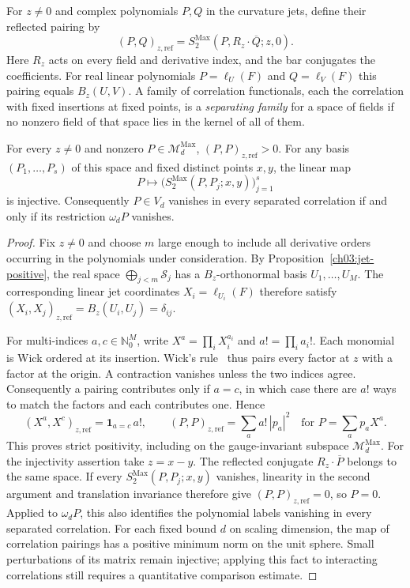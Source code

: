 For $z\ne0$ and complex polynomials $P,Q$ in the curvature jets, define
their reflected pairing by
\[
 (P,Q)_{z,\mathrm{ref}}
   =S_2^{\mathrm{Max}}(P,R_z\cdot\overline Q;z,0).
\]
Here $R_z$ acts on every field and derivative index, and the bar
conjugates the coefficients. For real linear polynomials
$P=\ell_U(F)$ and $Q=\ell_V(F)$ this pairing equals $B_z(U,V)$. A family of correlation functionals, each the correlation with fixed insertions at fixed points, is a \emph{separating family} for a space of fields if no nonzero field of that space lies in the kernel of all of them.

\begin{corollary}
\label{ch03:detectors}
For every $z\ne0$ and nonzero $P\in\mathcal M_d^{\mathrm{Max}}$,
$(P,P)_{z,\mathrm{ref}}>0$.
For any basis $(P_1,\ldots,P_s)$ of this space and fixed distinct points
$x,y$, the linear map
\[
 P\longmapsto
 \big(S_2^{\mathrm{Max}}(P,P_j;x,y)\big)_{j=1}^s
\]
is injective. Consequently $P\in V_d$ vanishes in every separated correlation if
and only if its restriction $\omega_dP$ vanishes.
\end{corollary}

\begin{proof}
Fix $z\ne0$ and choose $m$ large enough to include all derivative orders
occurring in the polynomials under consideration. By
Proposition~\ref{ch03:jet-positive}, the real space
$\bigoplus_{j<m}\mathcal S_j$ has a $B_z$-orthonormal basis
$U_1,\ldots,U_M$. The corresponding linear jet coordinates
$X_i=\ell_{U_i}(F)$ therefore satisfy
$(X_i,X_j)_{z,\mathrm{ref}}=B_z(U_i,U_j)=\delta_{ij}$.

For multi-indices $a,c\in\mathbb N_0^M$, write $X^a=\prod_i X_i^{a_i}$
and $a!=\prod_i a_i!$. Each monomial is Wick ordered at its insertion.
Wick's rule~\cite{Wick1950} thus pairs every factor at $z$ with a factor
at the origin. A contraction vanishes unless the two indices agree.
Consequently a pairing contributes only if $a=c$, in which case there
are $a!$ ways to match the factors and each contributes one. Hence
\[
 (X^a,X^c)_{z,\mathrm{ref}}=\mathbf1_{a=c}\,a!,
 \qquad (P,P)_{z,\mathrm{ref}}=\sum_a a!\,|p_a|^2
 \quad\text{for }P=\sum_a p_a X^a .
\]
This proves strict positivity, including on the gauge-invariant subspace
$\mathcal M_d^{\mathrm{Max}}$. For the injectivity assertion take $z=x-y$.
The reflected conjugate $R_z\cdot\overline P$ belongs to the same space.
If every $S_2^{\mathrm{Max}}(P,P_j;x,y)$ vanishes, linearity in the second
argument and translation invariance therefore give $(P,P)_{z,\mathrm{ref}}=0$,
so $P=0$. Applied to $\omega_dP$, this also identifies the polynomial labels
vanishing in every separated correlation. For each fixed bound $d$ on scaling dimension, the map of correlation pairings
has a positive minimum norm on the unit sphere. Small perturbations of
its matrix remain injective; applying this fact to interacting
correlations still requires a quantitative comparison estimate.
\end{proof}


